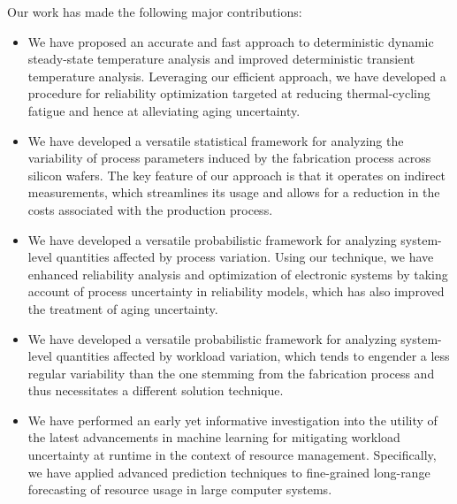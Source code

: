 Our work has made the following major contributions:

\begin{itemize}

\item
We have proposed an accurate and fast approach to deterministic dynamic
steady-state temperature analysis and improved deterministic transient
temperature analysis. Leveraging our efficient approach, we have developed a
procedure for reliability optimization targeted at reducing thermal-cycling
fatigue and hence at alleviating aging uncertainty.

\item
We have developed a versatile statistical framework for analyzing the
variability of process parameters induced by the fabrication process across
silicon wafers. The key feature of our approach is that it operates on indirect
measurements, which streamlines its usage and allows for a reduction in the
costs associated with the production process.

\item
We have developed a versatile probabilistic framework for analyzing system-level
quantities affected by process variation. Using our technique, we have enhanced
reliability analysis and optimization of electronic systems by taking account of
process uncertainty in reliability models, which has also improved the treatment
of aging uncertainty.

\item
We have developed a versatile probabilistic framework for analyzing system-level
quantities affected by workload variation, which tends to engender a less
regular variability than the one stemming from the fabrication process and thus
necessitates a different solution technique.

\item
We have performed an early yet informative investigation into the utility of the
latest advancements in machine learning for mitigating workload uncertainty at
runtime in the context of resource management. Specifically, we have applied
advanced prediction techniques to fine-grained long-range forecasting of
resource usage in large computer systems.

\end{itemize}
